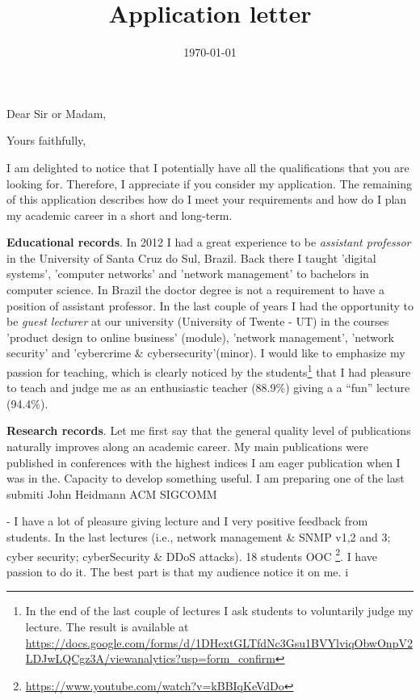 \documentclass[10pt,a4paper,sans]{libs/moderncv}%
\title{Application letter}
\begin{document}
\date{\today} %
\opening{Dear Sir or Madam,}
\closing{Yours faithfully,}

\makelettertitle

\justify

I am delighted to notice that I potentially have all the qualifications that you
are looking for. Therefore, I appreciate if you consider my application. The
remaining of this application describes how do I meet your requirements
and how do I plan my academic career in a short and long-term.

\textbf{Educational records}. In 2012 I had a great experience to be
\textit{assistant professor} in the University of Santa Cruz do Sul, Brazil.
Back there I taught 'digital systems', 'computer networks' and 'network
management' to bachelors in computer science. In Brazil the doctor degree is not
a requirement to have a position of assistant professor. In the last couple of
years I had the opportunity to be \textit{guest lecturer} at our university
(University of Twente - UT) in the courses 'product design to online business'
(module), 'network management', 'network security' and 'cybercrime \&
cybersecurity'(minor). I would like to emphasize my passion for teaching, which
is clearly noticed by the students\footnote{In the end of the last couple of
lectures I ask students to voluntarily judge my lecture. The result is available
at
\url{https://docs.google.com/forms/d/1DHextGLTfdNc3Gsu1BVYlviqObwOnpV2LDJwLQCgz3A/viewanalytics?usp=form_confirm}}
that I had pleasure to teach and judge me as an enthusiastic teacher (88.9\%)
giving a a ``fun'' lecture (94.4\%). 

\textbf{Research records}. Let me first say that the general quality level of
publications naturally improves along an academic career. My main publications
were published in conferences with the highest indices I am eager publication
when I was in the.  Capacity to develop something useful.  I am preparing one of
the last submiti John Heidmann ACM SIGCOMM

- I have a lot of pleasure giving lecture and I very positive feedback from
students. In the last lectures (i.e., network management \& SNMP v1,2 and 3;
cyber security; cyberSecurity \& DDoS attacks). 18 students
OOC \footnote{\url{https://www.youtube.com/watch?v=kBBIqKeVdDo}}.  I have passion to do it. The best part is that my audience notice it on
me.  i
\end{document}

